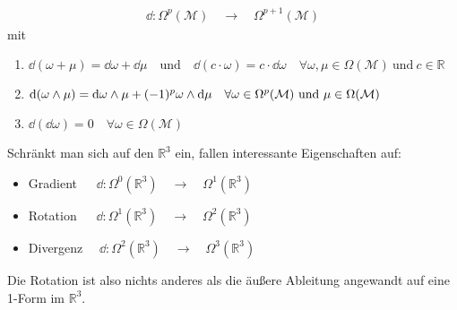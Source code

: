\begin{align*}
\dd: \Omega^p(\mathcal{M}) \quad \rightarrow \quad  \Omega^{p+1}(\mathcal{M})
\end{align*}
\centering mit
\begin{enumerate}
\item $\dd(\omega + \mu) = \dd\omega + \dd\mu \quad \text{und} \quad \dd(c\cdot\omega) = c\cdot\dd\omega \quad \forall \omega, \mu \in \Omega(\mathcal{M}) \ \text{und} \ c \in \mathbb{R} $
\item $\dd(\omega \wedge \mu) = \dd \omega \wedge \mu + (-1)^p \omega \wedge \dd\mu \quad \forall \omega \in \Omega^p(\mathcal{M}) \ \text{und} \ \mu \in \Omega(\mathcal{M})$
\item $\dd(\dd \omega) = 0 \quad \forall \omega \in \Omega(\mathcal{M}) $
\end{enumerate}
\flushleft
Schränkt man sich auf den $\mathbb{R}^3$ ein, fallen interessante Eigenschaften auf:
\begin{itemize}
\bfseries
\item Gradient $\quad \ \dd: \Omega^0(\mathbb{R}^3) \quad \rightarrow \quad  \Omega^1(\mathbb{R}^3)$
\item Rotation $\quad \ \dd: \Omega^1(\mathbb{R}^3) \quad \rightarrow \quad  \Omega^2(\mathbb{R}^3)$
\item Divergenz $\quad \dd: \Omega^2(\mathbb{R}^3) \quad \rightarrow \quad  \Omega^3(\mathbb{R}^3)$
\end{itemize}
\normalfont
Die Rotation ist also nichts anderes als die äußere Ableitung angewandt auf eine 1-Form im $\mathbb{R}^3.$